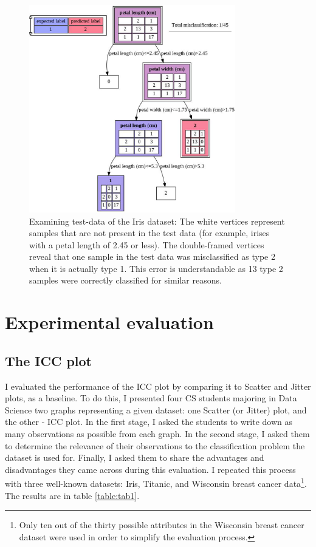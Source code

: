 \documentclass[11pt]{article}
\begin{document}
\begin{figure}[H]
\centering
\includegraphics[width=0.8\textwidth]{iris-magic.png}

\caption{Examining test-data of the Iris dataset: The white vertices represent samples that are not present in the test data (for example, irises with a petal length of 2.45 or less). The double-framed vertices reveal that one sample in the test data was misclassified as type 2 when it is actually type 1. This error is understandable as 13 type 2 samples were correctly classified for similar reasons.}
\label{fig:fig3}

\end{figure}

\section{Experimental evaluation}\label{Experimental evaluation}
\subsection{The ICC plot}
I evaluated the performance of the ICC plot by comparing it to Scatter and Jitter plots, as a baseline. To do this, I presented four CS students majoring in Data Science two graphs representing a given dataset: one Scatter (or Jitter) plot, and the other - ICC plot. In the first stage, I asked the students to write down as many observations as possible from each graph. In the second stage, I asked them to determine the relevance of their observations to the classification problem the dataset is used for. Finally, I asked them to share the advantages and disadvantages they came across during this evaluation. I repeated this process with three well-known datasets: Iris, Titanic, and Wisconsin breast cancer data\footnote{Only ten out of the thirty possible attributes in the Wisconsin breast cancer dataset were used in order to simplify the evaluation process.}. The results are in table \ref{table:tab1}.
\end{document}
